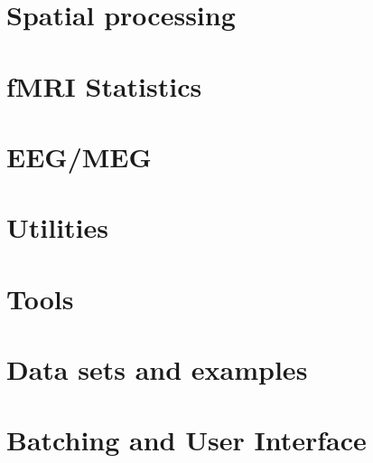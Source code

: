 \documentclass[a4paper,titlepage]{book}
\begin{document}
\part{Spatial processing}








\part{fMRI Statistics}



%


\part{EEG/MEG}









\part{Utilities}




%



%
%
%

%


\part{Tools}



%
%


\part{Data sets and examples}









\part{Batching and User Interface}





\end{document}

